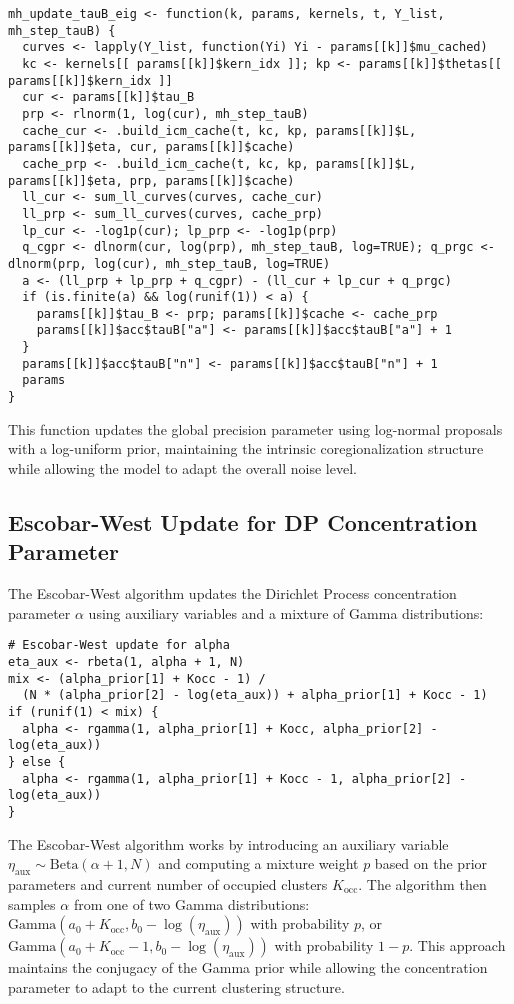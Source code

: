 \documentclass[11pt]{article}
\begin{document}
\begin{lstlisting}
mh_update_tauB_eig <- function(k, params, kernels, t, Y_list, mh_step_tauB) {
  curves <- lapply(Y_list, function(Yi) Yi - params[[k]]$mu_cached)
  kc <- kernels[[ params[[k]]$kern_idx ]]; kp <- params[[k]]$thetas[[ params[[k]]$kern_idx ]]
  cur <- params[[k]]$tau_B
  prp <- rlnorm(1, log(cur), mh_step_tauB)
  cache_cur <- .build_icm_cache(t, kc, kp, params[[k]]$L, params[[k]]$eta, cur, params[[k]]$cache)
  cache_prp <- .build_icm_cache(t, kc, kp, params[[k]]$L, params[[k]]$eta, prp, params[[k]]$cache)
  ll_cur <- sum_ll_curves(curves, cache_cur)
  ll_prp <- sum_ll_curves(curves, cache_prp)
  lp_cur <- -log1p(cur); lp_prp <- -log1p(prp)
  q_cgpr <- dlnorm(cur, log(prp), mh_step_tauB, log=TRUE); q_prgc <- dlnorm(prp, log(cur), mh_step_tauB, log=TRUE)
  a <- (ll_prp + lp_prp + q_cgpr) - (ll_cur + lp_cur + q_prgc)
  if (is.finite(a) && log(runif(1)) < a) { 
    params[[k]]$tau_B <- prp; params[[k]]$cache <- cache_prp
    params[[k]]$acc$tauB["a"] <- params[[k]]$acc$tauB["a"] + 1 
  }
  params[[k]]$acc$tauB["n"] <- params[[k]]$acc$tauB["n"] + 1
  params
}
\end{lstlisting}

This function updates the global precision parameter using log-normal proposals with a log-uniform prior, maintaining the intrinsic coregionalization structure while allowing the model to adapt the overall noise level.

\subsection{Escobar-West Update for DP Concentration Parameter}

The Escobar-West algorithm updates the Dirichlet Process concentration parameter $\alpha$ using auxiliary variables and a mixture of Gamma distributions:

\begin{lstlisting}
# Escobar-West update for alpha
eta_aux <- rbeta(1, alpha + 1, N)
mix <- (alpha_prior[1] + Kocc - 1) /
  (N * (alpha_prior[2] - log(eta_aux)) + alpha_prior[1] + Kocc - 1)
if (runif(1) < mix) {
  alpha <- rgamma(1, alpha_prior[1] + Kocc, alpha_prior[2] - log(eta_aux))
} else {
  alpha <- rgamma(1, alpha_prior[1] + Kocc - 1, alpha_prior[2] - log(eta_aux))
}
\end{lstlisting}

The Escobar-West algorithm works by introducing an auxiliary variable $\eta_{\text{aux}} \sim \text{Beta}(\alpha + 1, N)$ and computing a mixture weight $p$ based on the prior parameters and current number of occupied clusters $K_{\text{occ}}$. The algorithm then samples $\alpha$ from one of two Gamma distributions: $\text{Gamma}(a_0 + K_{\text{occ}}, b_0 - \log(\eta_{\text{aux}}))$ with probability $p$, or $\text{Gamma}(a_0 + K_{\text{occ}} - 1, b_0 - \log(\eta_{\text{aux}}))$ with probability $1-p$. This approach maintains the conjugacy of the Gamma prior while allowing the concentration parameter to adapt to the current clustering structure.
\end{document}
